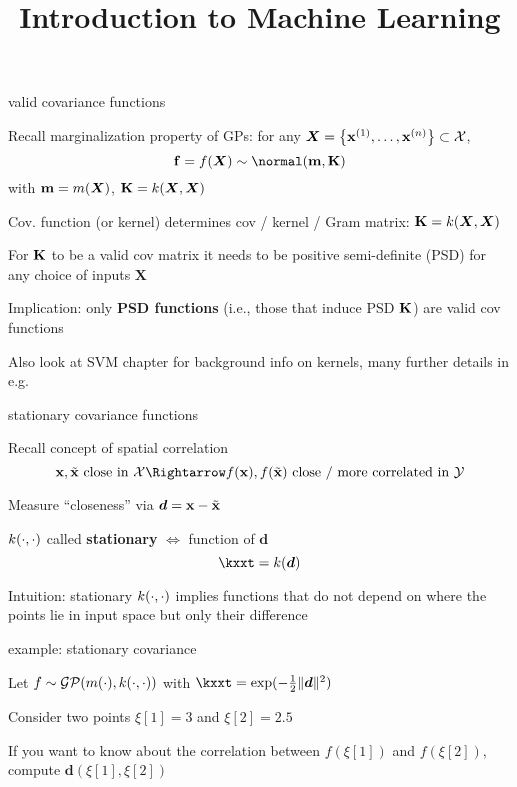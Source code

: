 \documentclass[11pt,compress,t,notes=noshow, xcolor=table]{beamer}
\title{Introduction to Machine Learning}
\begin{document}

\begin{framei}[sep=L]{valid covariance functions}
\item Recall marginalization property of GPs: for any $\bm{X} = \left\{ \mathbf{x}^{(1)}, \ldots, \mathbf{x}^{(n)}\right\} \subset \mathcal{X}$,
$$\fv = \fX \sim \Nmk$$
with $\mathbf{m} = m(\bm{X})$, $\mathbf{K} = k(\bm{X}, \bm{X})$
\item Cov. function (or kernel) determines cov / kernel / Gram matrix: $\mathbf{K} = k(\bm{X}, \bm{X})$
\item For $\mathbf{K}$ to be a valid cov matrix it needs to be positive semi-definite (PSD) for any choice of inputs $\bm{X}$
\item Implication: only \textbf{PSD functions} (i.e., those that induce PSD $\mathbf{K}$) are valid cov functions 

\item Also look at SVM chapter for background info on kernels, 
many further details in e.g. 

\end{framei}

\begin{framei}[sep=L]{stationary covariance functions}
\item Recall concept of spatial correlation
$$\xv, \xtil \text{ close in } \Xspace \Rightarrow \fx, f(\xtil) \text{ close / more correlated in } \Yspace$$
\item Measure ``closeness'' via $\bm{d} = \mathbf{x} - \tilde{\mathbf{x}}$ 
\item $k(\cdot, \cdot)$ called \textbf{stationary} $\Leftrightarrow$ function of $\bm{d}$ 
$$\kxxt = k(\bm{d})$$
\item Intuition: stationary $k(\cdot, \cdot)$ implies functions that do not depend on where the points lie in input space but only their difference 

\end{framei}

\begin{framei}{example: stationary covariance}
\item Let $f \sim \mathcal{GP}(m(\cdot), k(\cdot, \cdot))$ with $\kxxt = \exp(-\tfrac{1}{2}\|\bm{d}\|^2)$
\item Consider two points $\xi[1] = 3$ and $\xi[2] = 2.5$
\item If you want to know about the correlation between $f(\xi[1])$ and $f(\xi[2])$, compute $\bm{d}(\xi[1], \xi[2])$
\vfill
{}
\end{framei}
\end{document}
